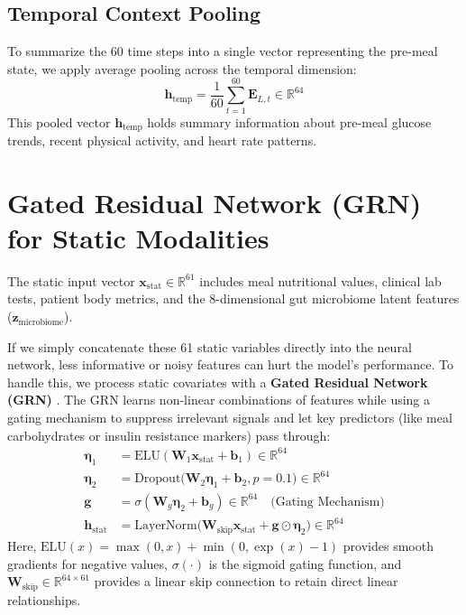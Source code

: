 \subsection{Temporal Context Pooling}
To summarize the 60 time steps into a single vector representing the pre-meal state, we apply average pooling across the temporal dimension:
\begin{equation}
    \mathbf{h}_{\text{temp}} = \frac{1}{60} \sum_{t=1}^{60} \mathbf{E}_{L, t} \in \mathbb{R}^{64}
\end{equation}
This pooled vector $\mathbf{h}_{\text{temp}}$ holds summary information about pre-meal glucose trends, recent physical activity, and heart rate patterns.

\section{Gated Residual Network (GRN) for Static Modalities}
The static input vector $\mathbf{x}_{\text{stat}} \in \mathbb{R}^{61}$ includes meal nutritional values, clinical lab tests, patient body metrics, and the 8-dimensional gut microbiome latent features ($\mathbf{z}_{\text{microbiome}}$). 

If we simply concatenate these 61 static variables directly into the neural network, less informative or noisy features can hurt the model's performance. To handle this, we process static covariates with a \textbf{Gated Residual Network (GRN)} \cite{lim2021temporal}. The GRN learns non-linear combinations of features while using a gating mechanism to suppress irrelevant signals and let key predictors (like meal carbohydrates or insulin resistance markers) pass through:
\begin{align}
    \mathbf{\eta}_1 &= \text{ELU}(\mathbf{W}_1 \mathbf{x}_{\text{stat}} + \mathbf{b}_1) \in \mathbb{R}^{64} \\
    \mathbf{\eta}_2 &= \text{Dropout}\big(\mathbf{W}_2 \mathbf{\eta}_1 + \mathbf{b}_2, p=0.1\big) \in \mathbb{R}^{64} \\
    \mathbf{g} &= \sigma(\mathbf{W}_g \mathbf{\eta}_2 + \mathbf{b}_g) \in \mathbb{R}^{64} \quad \text{(Gating Mechanism)} \\
    \mathbf{h}_{\text{stat}} &= \text{LayerNorm}\Big(\mathbf{W}_{\text{skip}} \mathbf{x}_{\text{stat}} + \mathbf{g} \odot \mathbf{\eta}_2\Big) \in \mathbb{R}^{64}
\end{align}
Here, $\text{ELU}(x) = \max(0, x) + \min(0, \exp(x) - 1)$ provides smooth gradients for negative values, $\sigma(\cdot)$ is the sigmoid gating function, and $\mathbf{W}_{\text{skip}} \in \mathbb{R}^{64 \times 61}$ provides a linear skip connection to retain direct linear relationships.

